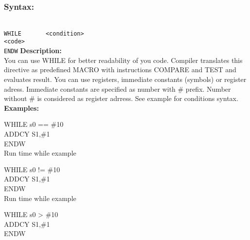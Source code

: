 {        \subsubsection{Syntax:}
        {
            ~\\
            \usecodefont
            \verb'WHILE       <condition>'\\
            \verb'<code>'\\
            \verb'ENDW'
        }
        \textbf{Description:}\\
        You can use WHILE for better readability of you code. Compiler translates this directive as predefined MACRO with instructions COMPARE and TEST and
        evaluates result. You can use registers, immediate constants (symbols) or register adress. Immediate constants are specified as number with \# prefix.
        Number without \# is considered as register adrress. See example for conditions syntax.
        \textbf{Examples:}\\
                \begin{code}[h!]
                        { \color{highlight_directive} WHILE  }
                        { \color{highlight_constant}   s0 == \#10 }\\
                        { \color{highlight_instruction} ADDCY    S1,\#1 }\\
                        { \color{highlight_directive}  ENDW}\\
                    \caption{Run time while example}
                \end{code}
                \begin{code}[h!]
                        { \color{highlight_directive} WHILE  }
                        { \color{highlight_constant}   s0  != \#10 }\\
                        { \color{highlight_instruction} ADDCY    S1,\#1 }\\
                        { \color{highlight_directive}  ENDW}\\
                    \caption{Run time while example}
                \end{code}
                \begin{code}[h!]
                        { \color{highlight_directive} WHILE  }
                        { \color{highlight_constant}   s0 >    \#10 }\\
                        { \color{highlight_instruction} ADDCY    S1,\#1 }\\
                        { \color{highlight_directive}  ENDW}\\

\end{code}}
